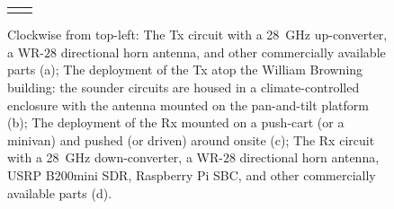 \documentclass[10pt, twocolumn]{IEEEtran}
\begin{document}
\begin{figure}[t]
\begin{tabular}{cc}
\begin{minipage}{0.478\linewidth}
        \end{minipage}
    \end{tabular}
    \caption{Clockwise from top-left: The Tx circuit with a \SI{28}{\giga\hertz} up-converter, a WR-$28$ directional horn antenna, and other commercially available parts (a); The deployment of the Tx atop the William Browning building: the sounder circuits are housed in a climate-controlled enclosure with the antenna mounted on the pan-and-tilt platform (b); The deployment of the Rx mounted on a push-cart (or a minivan) and pushed (or driven) around onsite (c); The Rx circuit with a \SI{28}{\giga\hertz} down-converter, a WR-$28$ directional horn antenna, USRP B$200$mini SDR, Raspberry Pi SBC, and other commercially available parts (d).}
    \label{F2}
    \vspace{-6mm}
\end{figure}
\end{document}

